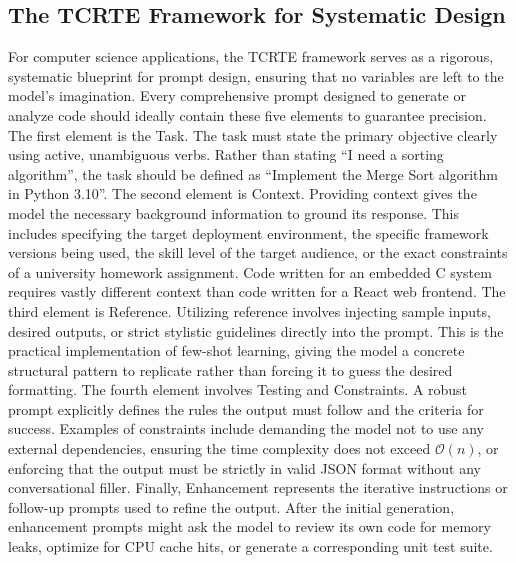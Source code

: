 \documentclass[12pt]{article}
\begin{document}
\subsection{The TCRTE Framework for Systematic Design}
For computer science applications, the TCRTE framework
serves as a rigorous, systematic blueprint for prompt design, ensuring that no variables are left to the
model's imagination. Every comprehensive prompt designed to generate or analyze code should ideally contain
these five elements to guarantee precision. The first element is the Task. The task must state the primary
objective clearly using active, unambiguous verbs. Rather than stating ``I need a sorting algorithm'', the task
should be defined as ``Implement the Merge Sort algorithm in Python 3.10''. The second element is
Context. Providing context gives the model the necessary background information to ground its response. This
includes specifying the target deployment environment, the specific framework versions being used, the skill
level of the target audience, or the exact constraints of a university homework assignment. Code written for an
embedded C system requires vastly different context than code written for a React web frontend. The third
element is Reference. Utilizing reference involves injecting sample inputs, desired outputs, or strict
stylistic guidelines directly into the prompt. This is the practical implementation of few-shot learning,
giving the model a concrete structural pattern to replicate rather than forcing it to guess the desired
formatting. The fourth element involves Testing and Constraints. A robust prompt explicitly defines the rules
the output must follow and the criteria for success. Examples of constraints include demanding the model not to
use any external dependencies, ensuring the time complexity does not exceed $\mathcal{O}(n)$, or enforcing that
the output must be strictly in valid JSON format without any conversational filler. Finally, Enhancement
represents the iterative instructions or follow-up prompts used to refine the output. After the initial
generation, enhancement prompts might ask the model to review its own code for memory leaks, optimize for CPU
cache hits, or generate a corresponding unit test suite.
\end{document}
